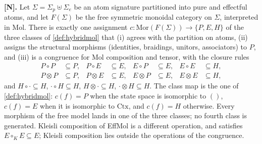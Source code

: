 \begin{theorem}\label{thm:67}\label{thm:classification}
\textbf{[N].} Let $\Sigma = \Sigma_p \uplus \Sigma_e$ be an atom
signature partitioned into pure and effectful atoms, and let
$F(\Sigma)$ be the free symmetric monoidal category on $\Sigma$,
interpreted in Mol. There is exactly one assignment
$c : \mathrm{Mor}(F(\Sigma)) \to \{P, E, H\}$ of the three classes of
\autoref{def:hybridmol} that (i) agrees with the partition on atoms,
(ii) assigns the structural morphisms (identities, braidings, unitors,
associators) to $P$, and (iii) is a congruence for Mol composition and
tensor, with the closure rules
\begin{align*}
P \circ P &\subseteq P, &
P \circ E &\subseteq E, &
E \circ P &\subseteq E, &
E \circ E &\subseteq H,\\
P \otimes P &\subseteq P, &
P \otimes E &\subseteq E, &
E \otimes P &\subseteq E, &
E \otimes E &\subseteq H,
\end{align*}
and $H \circ {\cdot} \subseteq H$, ${\cdot} \circ H \subseteq H$,
$H \otimes {\cdot} \subseteq H$, ${\cdot} \otimes H \subseteq H$.
The class map is the one of \autoref{def:hybridmol}: $c (f) = P$ when
the state space is isomorphic to $()$, $c (f) = E$ when it is
isomorphic to $\mathrm{Ctx}$, and $c (f) = H$ otherwise. Every morphism
of the free model lands in one of the three classes; no fourth class is
generated. Kleisli composition of EffMol is a different operation, and
satisfies $E \circ_K E \subseteq E$; Kleisli composition lies outside
the operations of the congruence.
\end{theorem}

